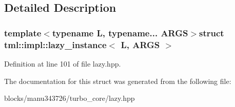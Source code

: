 \subsection{Detailed Description}
\subsubsection*{template$<$typename L, typename... A\+R\+G\+S$>$struct tml\+::impl\+::lazy\+\_\+instance$<$ L, A\+R\+G\+S $>$}



Definition at line 101 of file lazy.\+hpp.



The documentation for this struct was generated from the following file\+:\begin{DoxyCompactItemize}
\item 
blocks/manu343726/turbo\+\_\+core/lazy.\+hpp\end{DoxyCompactItemize}

